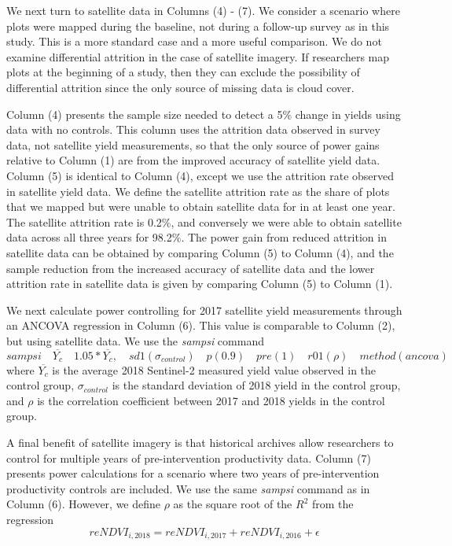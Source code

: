 \documentclass{article}
\begin{document}
We next turn to satellite data in Columns (4) - (7). We consider a scenario where plots were mapped during the baseline, not during a follow-up survey as in this study. This is a more standard case and a more useful comparison. We do not examine differential attrition in the case of satellite imagery. If researchers map plots at the beginning of a study, then they can exclude the possibility of differential attrition since the only source of missing data is cloud cover.   

Column (4) presents the sample size needed to detect a 5\% change in yields using data with no controls. This column uses the attrition data observed in survey data, not satellite yield measurements, so that the only source of power gains relative to Column (1) are from the improved accuracy of satellite yield data. Column (5) is identical to Column (4), except we use the attrition rate observed in satellite yield data. We define the satellite attrition rate as the share of plots that we mapped but were unable to obtain satellite data for in at least one year. The satellite attrition rate is 0.2\%, and conversely we were able to obtain satellite data across all three years for 98.2\%. The power gain from reduced attrition in satellite data can be obtained by comparing Column (5) to Column (4), and the sample reduction from the increased accuracy of satellite data and the lower attrition rate in satellite data is given by comparing Column (5) to Column (1).
 
We next calculate power controlling for 2017 satellite yield measurements through an ANCOVA regression in Column (6). This value is comparable to Column (2), but using satellite data. We use the \textit{sampsi} command 
$$ 
sampsi \quad \overline{Y_c} \quad 1.05*\overline{Y_c}, \quad sd1(\sigma_{control}) \quad p(0.9) \quad pre(1) \quad r01(\rho) \quad method(ancova) 
$$
where $\overline{Y_c}$ is the average 2018 Sentinel-2 measured yield value observed in the control group, $\sigma_{control}$ is the standard deviation of 2018 yield in the control group, and $\rho$ is the correlation coefficient between 2017 and 2018 yields in the control group.

A final benefit of satellite imagery is that historical archives allow researchers to control for multiple years of pre-intervention productivity data. Column (7) presents power calculations for a scenario where two years of pre-intervention productivity controls are included. We use the same \textit{sampsi} command as in Column (6). However, we define $\rho$ as the square root of the $R^2$ from the regression 
$$
reNDVI_{i, 2018} = reNDVI_{i, 2017} + reNDVI_{i, 2016} + \epsilon  
$$
\end{document}
